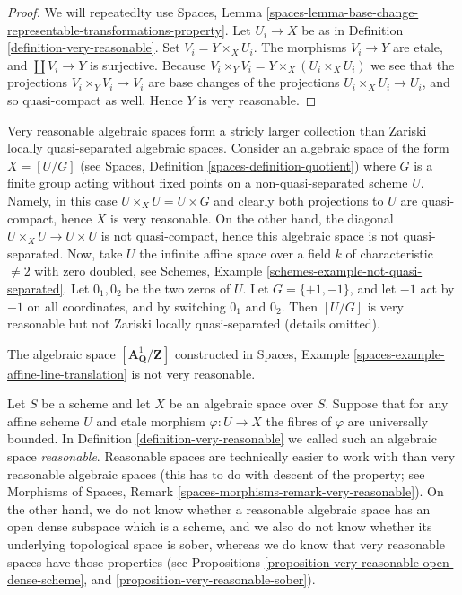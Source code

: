 \begin{proof}
We will repeatedlty use
Spaces, Lemma
\ref{spaces-lemma-base-change-representable-transformations-property}.
Let $U_i \to X$ be as in Definition \ref{definition-very-reasonable}.
Set $V_i = Y \times_X U_i$. The morphisms $V_i \to Y$ are etale,
and $\coprod V_i \to Y$ is surjective. Because
$V_i \times_Y V_i = Y \times_X (U_i \times_X U_i)$ we see
that the projections $V_i \times_Y V_i \to V_i$ are
base changes of the projections $U_i \times_X U_i \to U_i$, and so
quasi-compact as well. Hence $Y$ is very reasonable.
\end{proof}

\begin{remark}
\label{remark-very-reasonable-Zariski-locally-quasi-separated}
Very reasonable algebraic spaces form a stricly larger collection than
Zariski locally quasi-separated algebraic spaces. Consider
an algebraic space of the form $X = [U/G]$ (see
Spaces, Definition \ref{spaces-definition-quotient})
where $G$ is a finite group acting without fixed points on a
non-quasi-separated scheme $U$. Namely, in this case
$U \times_X U = U \times G$ and clearly both projections to $U$ are
quasi-compact, hence $X$ is very reasonable. On the other hand, the diagonal
$U \times_X U \to U \times U$ is not quasi-compact, hence this
algebraic space is not quasi-separated. Now, take $U$ the infinite
affine space over a field $k$ of characteristic $\not = 2$ with
zero doubled, see
Schemes, Example \ref{schemes-example-not-quasi-separated}.
Let $0_1, 0_2$ be the two zeros of $U$. Let $G = \{+1, -1\}$, and
let $-1$ act by $-1$ on all coordinates, and by switching
$0_1$ and $0_2$. Then $[U/G]$ is very reasonable but not Zariski locally
quasi-separated (details omitted).
\end{remark}

\begin{example}
\label{example-not-very-reasonable}
The algebraic space $[\mathbf{A}^1_{\mathbf{Q}}/\mathbf{Z}]$ constructed in
Spaces, Example \ref{spaces-example-affine-line-translation}
is not very reasonable.
\end{example}

\begin{remark}
\label{remark-reasonable}
Let $S$ be a scheme and let $X$ be an algebraic space over $S$.
Suppose that for any affine scheme $U$ and etale morphism
$\varphi : U \to X$ the fibres of $\varphi$ are universally bounded. In
Definition \ref{definition-very-reasonable}
we called such an algebraic space {\it reasonable}. Reasonable spaces are
technically easier to work with than very reasonable algebraic spaces
(this has to do with descent of the property; see
Morphisms of Spaces, Remark \ref{spaces-morphisms-remark-very-reasonable}).
On the other hand, we do not know whether a reasonable algebraic
space has an open dense subspace which is a scheme, and we also do not know
whether its underlying topological space is sober, whereas we do know that
very reasonable spaces have those properties (see
Propositions \ref{proposition-very-reasonable-open-dense-scheme}, and
\ref{proposition-very-reasonable-sober}).
\end{remark}

